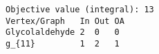 \begin{verbatim}
Objective value (integral): 13
Vertex/Graph   In Out OA 
Glycolaldehyde 2  0   0  
g_{11}         1  2   1  
\end{verbatim}

